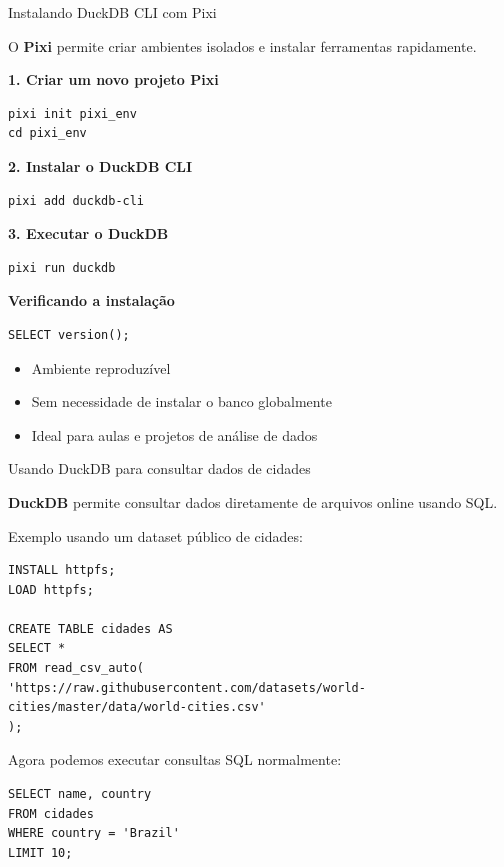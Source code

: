 \documentclass{beamer}
\begin{document}
\begin{frame}[fragile]{Instalando DuckDB CLI com Pixi}
    
    O \textbf{Pixi} permite criar ambientes isolados e instalar ferramentas rapidamente.
    
    \vspace{0.3cm}
    
    \textbf{1. Criar um novo projeto Pixi}
    
    \begin{verbatim}
pixi init pixi_env
cd pixi_env
    \end{verbatim}
    
    \textbf{2. Instalar o DuckDB CLI}
    
    \begin{verbatim}
pixi add duckdb-cli
    \end{verbatim}
    
    \textbf{3. Executar o DuckDB}
    
    \begin{verbatim}
pixi run duckdb
    \end{verbatim}
    
    \vspace{0.3cm}
    
    \textbf{Verificando a instalação}
    
    \begin{verbatim}
SELECT version();
    \end{verbatim}
    
    \begin{itemize}
        \item Ambiente reproduzível
        \item Sem necessidade de instalar o banco globalmente
        \item Ideal para aulas e projetos de análise de dados
    \end{itemize}
    
\end{frame}


\begin{frame}[fragile]{Usando DuckDB para consultar dados de cidades}
    
    \textbf{DuckDB} permite consultar dados diretamente de arquivos online usando SQL.
    
    \vspace{0.3cm}
    
    Exemplo usando um dataset público de cidades:
    
    \begin{verbatim}
INSTALL httpfs;
LOAD httpfs;

CREATE TABLE cidades AS
SELECT *
FROM read_csv_auto(
'https://raw.githubusercontent.com/datasets/world-cities/master/data/world-cities.csv'
);
    \end{verbatim}
    
    Agora podemos executar consultas SQL normalmente:
    
    \begin{verbatim}
SELECT name, country
FROM cidades
WHERE country = 'Brazil'
LIMIT 10;
    \end{verbatim}
    
\end{frame}
\end{document}

